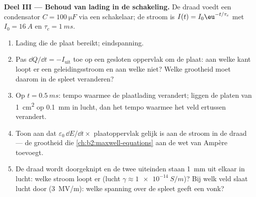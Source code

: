 \begin{problem}
\medskip
\noindent\textbf{Deel III --- Behoud van lading in de schakeling.}
De draad voedt een condensator $C = \qty{100}{\micro F}$ via een schakelaar;
de stroom is $I(t) = I_0\eu^{-t/\tau_c}$ met $I_0 = \qty{16}{A}$ en
$\tau_c = \qty{1}{ms}$.
\begin{enumerate}[resume]
  \item Lading die de plaat bereikt; eindspanning.
  \item Pas $\dd Q/\dd t = -I_{\text{uit}}$ toe op een gesloten oppervlak om
        de plaat: aan welke kant loopt er een geleidingsstroom en aan welke
        niet? Welke grootheid moet daarom in de spleet veranderen?
  \item Op $t = \qty{0.5}{ms}$: tempo waarmee de plaatlading verandert;
        liggen de platen van \qty{1}{cm^2} op \qty{0.1}{mm} in lucht, dan
        het tempo waarmee het veld ertussen verandert.
  \item Toon aan dat $\varepsilon_0\,\dd E/\dd t \times$ plaatoppervlak
        gelijk is aan de stroom in de draad --- de grootheid die
        \cref{ch:b2:maxwell-equations} aan de wet van Ampère toevoegt.
  \item De draad wordt doorgeknipt en de twee uiteinden staan \qty{1}{mm}
        uit elkaar in lucht: welke stroom loopt er (lucht
        $\gamma \approx \qty{1e-14}{S/m}$)? Bij welk veld slaat lucht door
        (\qty{3}{MV/m}): welke spanning over de spleet geeft een vonk?
\end{enumerate}


\end{problem}
